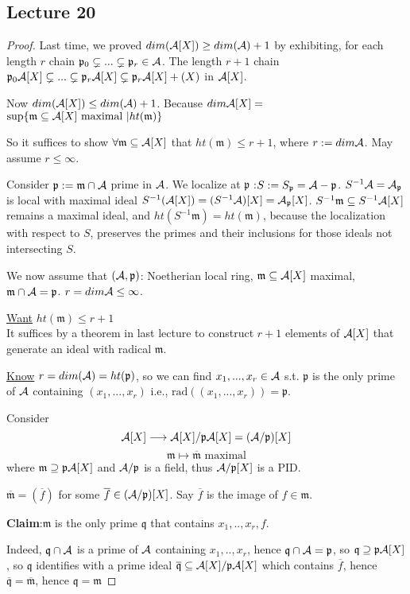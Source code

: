 \documentclass[11pt]{article}
\newcommand{\scm}{{\mathfrak m}}
\newcommand{\scp}{{\mathfrak p}}
\newcommand{\scq}{\mathfrak q}
\newcommand{\cala}{{\cal A}}
\newcommand{\lrta}{\longrightarrow}
\begin{document}
\subsection{Lecture 20}
\begin{proof}
Last time, we proved $dim(\cala[X])\geq dim(\cala)+1$ by exhibiting, for each length $r$ chain $\scp_0\subsetneq ...\subsetneq \scp_r\in \cala$. The length $r+1$ chain $\scp_0\cala[X]\subsetneq ...\subsetneq \scp_r\cala[X]\subsetneq \scp_r\cala[X]+(X)$ in $\cala[X]$.

Now $dim(\cala[X])\leq dim(\cala)+1$. Because $dim \cala[X]=$ $\sup\{\scm\subseteq \cala[X] \text{ maximal }|ht(\scm)\}$

So it suffices to show $\forall\scm\subseteq \cala[X]$ that $ht(\scm)\leq r+1$, where $r:=dim\cala$. May assume $r\leq \infty$.

Consider $\scp:=\scm\cap\cala$ prime in $\cala$. We localize at $\scp$ :$S:=S_\scp=\cala-\scp$. $S^{-1}\cala=\cala_\scp$ is local with maximal ideal $S^{-1}(\cala[X])=(S^{-1}\cala)[X]=\cala_\scp[X]$. $S^{-1}\scm\subseteq S^{-1}\cala[X]$ remains a maximal ideal, and $ht(S^{-1}\scm)=ht(\scm)$, because the localization with respect to $S$, preserves the primes and their inclusions for those ideals not intersecting $S$.

We now assume that $(\cala,\scp)$: Noetherian local ring, $\scm\subseteq\cala[X]$ maximal, $\scm\cap\cala=\scp$. $r=dim\cala\leq \infty$.

\underline{Want} $ht(\scm)\leq r+1$\\
It suffices by a theorem in last lecture to construct $r+1$ elements of $\cala[X]$ that generate an ideal with radical $\scm$.

\underline{Know} $r=dim(\cala)=ht(\scp)$, so we can find $x_1,...,x_r\in\cala$ s.t.
$\scp$ is the only prime of $\cala$ containing $(x_1,...,x_r)$ i.e., $\text{rad}((x_1,...,x_r))=\scp.$

Consider
$$
\cala[X]\lrta\cala[X]/\scp\cala[X]=(\cala/\scp)[X]$$
$$
\scm\longmapsto\overline{\scm}\text{ maximal}
$$
where $\scm\supseteq\scp\cala[X]$ and $\cala/\scp$ is a field, thus $\cala/\scp[X]$ is a PID.

$\overline{\scm}=(\overline{f})$ for some $\overline{f}\in(\cala/\scp)[X]$. Say $\overline{f}$ is the image of $f\in\scm$.

\textbf{Claim}:$\scm$ is the only prime $\scq$ that contains $x_1,..,x_r,f.$

Indeed, $\scq\cap \cala$ is a prime of $\cala$ containing $x_1,..,x_r$, hence $\scq\cap \cala=\scp$, so $\scq\supseteq \scp\cala[X]$, so $\scq$ identifies with a prime ideal $\overline{\scq}\subseteq \cala[X]/\scp\cala[X]$ which contains $\overline{f}$, hence $\overline{\scq}=\overline{\scm}$, hence $\scq=\scm$

\end{proof}
\end{document}
